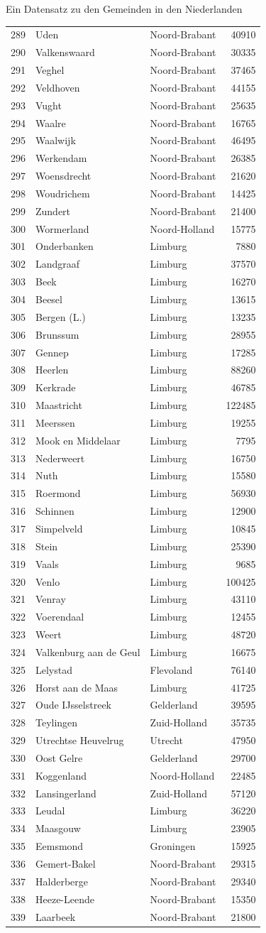 \documentclass[ignorenonframetext,]{beamer}
\begin{document}
\begin{frame}[fragile]{Ein Datensatz zu den Gemeinden in den
Niederlanden}
\begin{longtable}[]{@{}lllr@{}}
289 & Uden & Noord-Brabant & 40910\tabularnewline
290 & Valkenswaard & Noord-Brabant & 30335\tabularnewline
291 & Veghel & Noord-Brabant & 37465\tabularnewline
292 & Veldhoven & Noord-Brabant & 44155\tabularnewline
293 & Vught & Noord-Brabant & 25635\tabularnewline
294 & Waalre & Noord-Brabant & 16765\tabularnewline
295 & Waalwijk & Noord-Brabant & 46495\tabularnewline
296 & Werkendam & Noord-Brabant & 26385\tabularnewline
297 & Woensdrecht & Noord-Brabant & 21620\tabularnewline
298 & Woudrichem & Noord-Brabant & 14425\tabularnewline
299 & Zundert & Noord-Brabant & 21400\tabularnewline
300 & Wormerland & Noord-Holland & 15775\tabularnewline
301 & Onderbanken & Limburg & 7880\tabularnewline
302 & Landgraaf & Limburg & 37570\tabularnewline
303 & Beek & Limburg & 16270\tabularnewline
304 & Beesel & Limburg & 13615\tabularnewline
305 & Bergen (L.) & Limburg & 13235\tabularnewline
306 & Brunssum & Limburg & 28955\tabularnewline
307 & Gennep & Limburg & 17285\tabularnewline
308 & Heerlen & Limburg & 88260\tabularnewline
309 & Kerkrade & Limburg & 46785\tabularnewline
310 & Maastricht & Limburg & 122485\tabularnewline
311 & Meerssen & Limburg & 19255\tabularnewline
312 & Mook en Middelaar & Limburg & 7795\tabularnewline
313 & Nederweert & Limburg & 16750\tabularnewline
314 & Nuth & Limburg & 15580\tabularnewline
315 & Roermond & Limburg & 56930\tabularnewline
316 & Schinnen & Limburg & 12900\tabularnewline
317 & Simpelveld & Limburg & 10845\tabularnewline
318 & Stein & Limburg & 25390\tabularnewline
319 & Vaals & Limburg & 9685\tabularnewline
320 & Venlo & Limburg & 100425\tabularnewline
321 & Venray & Limburg & 43110\tabularnewline
322 & Voerendaal & Limburg & 12455\tabularnewline
323 & Weert & Limburg & 48720\tabularnewline
324 & Valkenburg aan de Geul & Limburg & 16675\tabularnewline
325 & Lelystad & Flevoland & 76140\tabularnewline
326 & Horst aan de Maas & Limburg & 41725\tabularnewline
327 & Oude IJsselstreek & Gelderland & 39595\tabularnewline
328 & Teylingen & Zuid-Holland & 35735\tabularnewline
329 & Utrechtse Heuvelrug & Utrecht & 47950\tabularnewline
330 & Oost Gelre & Gelderland & 29700\tabularnewline
331 & Koggenland & Noord-Holland & 22485\tabularnewline
332 & Lansingerland & Zuid-Holland & 57120\tabularnewline
333 & Leudal & Limburg & 36220\tabularnewline
334 & Maasgouw & Limburg & 23905\tabularnewline
335 & Eemsmond & Groningen & 15925\tabularnewline
336 & Gemert-Bakel & Noord-Brabant & 29315\tabularnewline
337 & Halderberge & Noord-Brabant & 29340\tabularnewline
338 & Heeze-Leende & Noord-Brabant & 15350\tabularnewline
339 & Laarbeek & Noord-Brabant & 21800\tabularnewline

\end{longtable}
\end{frame}
\end{document}
